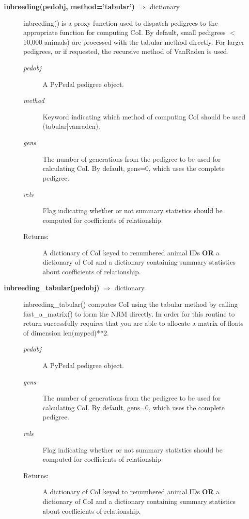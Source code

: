 \begin{description}
\item[\textbf{inbreeding(pedobj, method='tabular')} $\Rightarrow$ dictionary] 
inbreeding() is a proxy function used to dispatch pedigrees to the appropriate function for computing CoI. By default, small pedigrees $<$ 10,000 animals) are processed with the tabular method directly. For larger pedigrees, or if requested, the recursive method of VanRaden \cite{VanRaden1992a} is used.
\begin{description}
\item[\emph{pedobj}] A PyPedal pedigree object.
\item[\emph{method}] Keyword indicating which method of computing CoI should be used (tabular|vanraden).
\item[\emph{gens}] The number of generations from the pedigree to be used for calculating CoI.  By default, gens=0, which uses the complete pedigree.
\item[\emph{rels}] Flag indicating whether or not summary statistics should be computed for coefficients of relationship.
\item[Returns:] A dictionary of CoI keyed to renumbered animal IDs \textbf{OR} a dictionary of CoI and a dictionary containing summary statistics about coefficients of relationship.
\end{description}

\item[\textbf{inbreeding\_tabular(pedobj)} $\Rightarrow$ dictionary] 
inbreeding\_tabular() computes CoI using the tabular method by calling fast\_a\_matrix() to form the NRM directly. In order for this routine to return successfully requires that you are able to allocate a matrix of floats of dimension len(myped)**2.
\begin{description}
\item[\emph{pedobj}] A PyPedal pedigree object.
\item[\emph{gens}] The number of generations from the pedigree to be used for calculating CoI.  By default, gens=0, which uses the complete pedigree.
\item[\emph{rels}] Flag indicating whether or not summary statistics should be computed for coefficients of relationship.
\item[Returns:] A dictionary of CoI keyed to renumbered animal IDs \textbf{OR} a dictionary of CoI and a dictionary containing summary statistics about coefficients of relationship.
\end{description}


\end{description}
